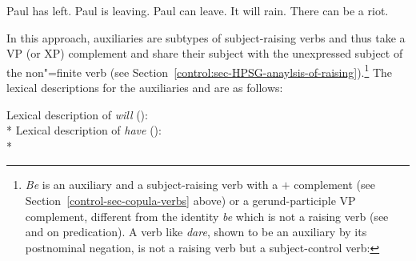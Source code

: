 	
\begin{exe}
\ex \begin{xlist}
\ex Paul has left.
\ex Paul is leaving.
\ex Paul can leave.
\ex It will rain.
\ex There can be a riot.
\end{xlist}	
\end{exe}

In this approach,  auxiliaries are subtypes of subject-raising verbs and thus take a VP (or
XP) complement and share their subject with the unexpressed subject of the non"=finite verb (see Section~\ref{control:sec-HPSG-anaylsis-of-raising}).\footnote{ \emph{Be} is an auxiliary and a subject-raising verb with a \prd$+$ complement (see
  Section~\ref{control-sec-copula-verbs} above) or a gerund-participle VP complement,
  different from the identity \emph{be} which is not a raising verb (see \citealp{VanEynde2008a} and
  \citealp{MuellerPredication} on predication). A verb like \emph{dare}, shown to be an auxiliary by
  its postnominal negation, is not a raising verb but a subject-control verb:
\eal
{}
\zllast
}
The lexical descriptions for the auxiliaries  and  are as follows: 

\ea
Lexical description of \emph{will} ():\\*
\z
\eas
Lexical description of \emph{have} ():\\*
\zs

